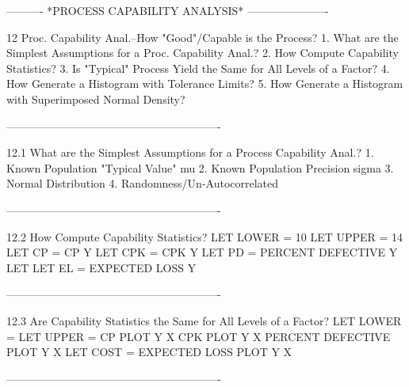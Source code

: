  
 
 
 
 
 
 
 
 
 
 
 
 
 
 
 
 
 
 
 
 
 
 
 
 
 
 
 
 
 
 
 
 
 
 
 
 
 
 
 
 
 
----------  *PROCESS CAPABILITY ANALYSIS*  ----------------------
 
12
Proc. Capability Anal.--How "Good"/Capable is the Process?
   1. What are the Simplest Assumptions for a Proc. Capability Anal.?
   2. How Compute Capability Statistics?
   3. Is "Typical" Process Yield the Same for All Levels of a Factor?
   4. How Generate a Histogram with Tolerance Limits?
   5. How Generate a Histogram with Superimposed Normal Density?
 
----------------------------------------------------------
 
12.1
What are the Simplest Assumptions for a Process Capability Anal.?
   1. Known Population "Typical Value" mu
   2. Known Population Precision sigma
   3. Normal Distribution
   4. Randomness/Un-Autocorrelated
 
----------------------------------------------------------
 
12.2
How Compute Capability Statistics?
      LET LOWER = 10
      LET UPPER = 14
      LET CP = CP Y
      LET CPK = CPK Y
      LET PD = PERCENT DEFECTIVE Y
      LET
      LET EL = EXPECTED LOSS Y
 
----------------------------------------------------------
 
12.3
Are Capability Statistics the Same for All Levels of a Factor?
         LET LOWER =
         LET UPPER =
         CP PLOT Y X
         CPK PLOT Y X
         PERCENT DEFECTIVE PLOT Y X
         LET COST =
         EXPECTED LOSS PLOT Y X
 
----------------------------------------------------------
 
